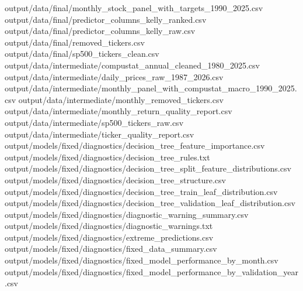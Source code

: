 \documentclass[
  11pt,
  a4paper]{article}
\newenvironment{Shaded}{}{}
\newcommand{\NormalTok}[1]{#1}
\begin{document}
\begin{Shaded}
\begin{Highlighting}[]
\NormalTok{output/data/final/monthly\_\allowbreak{}stock\_\allowbreak{}panel\_\allowbreak{}with\_\allowbreak{}targets\_\allowbreak{}1990\_\allowbreak{}2025.csv}
\NormalTok{output/data/final/predictor\_\allowbreak{}columns\_\allowbreak{}kelly\_\allowbreak{}ranked.csv}
\NormalTok{output/data/final/predictor\_\allowbreak{}columns\_\allowbreak{}kelly\_\allowbreak{}raw.csv}
\NormalTok{output/data/final/removed\_\allowbreak{}tickers.csv}
\NormalTok{output/data/final/sp500\_\allowbreak{}tickers\_\allowbreak{}clean.csv}
\NormalTok{output/data/intermediate/compustat\_\allowbreak{}annual\_\allowbreak{}cleaned\_\allowbreak{}1980\_\allowbreak{}2025.csv}
\NormalTok{output/data/intermediate/daily\_\allowbreak{}prices\_\allowbreak{}raw\_\allowbreak{}1987\_\allowbreak{}2026.csv}
\NormalTok{output/data/intermediate/monthly\_\allowbreak{}panel\_\allowbreak{}with\_\allowbreak{}compustat\_\allowbreak{}macro\_\allowbreak{}1990\_\allowbreak{}2025.csv}
\NormalTok{output/data/intermediate/monthly\_\allowbreak{}removed\_\allowbreak{}tickers.csv}
\NormalTok{output/data/intermediate/monthly\_\allowbreak{}return\_\allowbreak{}quality\_\allowbreak{}report.csv}
\NormalTok{output/data/intermediate/sp500\_\allowbreak{}tickers\_\allowbreak{}raw.csv}
\NormalTok{output/data/intermediate/ticker\_\allowbreak{}quality\_\allowbreak{}report.csv}
\NormalTok{output/models/fixed/diagnostics/decision\_\allowbreak{}tree\_\allowbreak{}feature\_\allowbreak{}importance.csv}
\NormalTok{output/models/fixed/diagnostics/decision\_\allowbreak{}tree\_\allowbreak{}rules.txt}
\NormalTok{output/models/fixed/diagnostics/decision\_\allowbreak{}tree\_\allowbreak{}split\_\allowbreak{}feature\_\allowbreak{}distributions.csv}
\NormalTok{output/models/fixed/diagnostics/decision\_\allowbreak{}tree\_\allowbreak{}structure.csv}
\NormalTok{output/models/fixed/diagnostics/decision\_\allowbreak{}tree\_\allowbreak{}train\_\allowbreak{}leaf\_\allowbreak{}distribution.csv}
\NormalTok{output/models/fixed/diagnostics/decision\_\allowbreak{}tree\_\allowbreak{}validation\_\allowbreak{}leaf\_\allowbreak{}distribution.csv}
\NormalTok{output/models/fixed/diagnostics/diagnostic\_\allowbreak{}warning\_\allowbreak{}summary.csv}
\NormalTok{output/models/fixed/diagnostics/diagnostic\_\allowbreak{}warnings.txt}
\NormalTok{output/models/fixed/diagnostics/extreme\_\allowbreak{}predictions.csv}
\NormalTok{output/models/fixed/diagnostics/fixed\_\allowbreak{}data\_\allowbreak{}summary.csv}
\NormalTok{output/models/fixed/diagnostics/fixed\_\allowbreak{}model\_\allowbreak{}performance\_\allowbreak{}by\_\allowbreak{}month.csv}
\NormalTok{output/models/fixed/diagnostics/fixed\_\allowbreak{}model\_\allowbreak{}performance\_\allowbreak{}by\_\allowbreak{}validation\_\allowbreak{}year.csv}

\end{Highlighting}
\end{Shaded}
\end{document}
